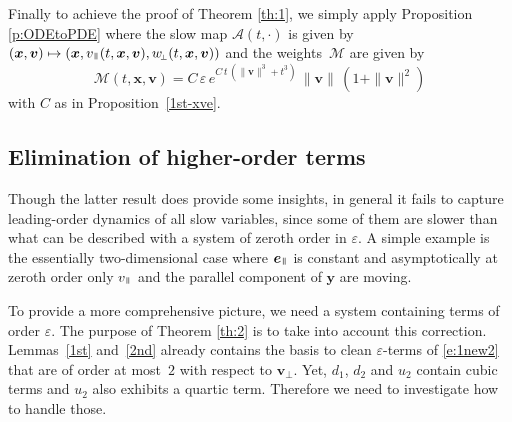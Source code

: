 \documentclass[10pt]{amsart}
\let\mathcal\mathscr
\newcommand\mto{\mathchoice{\longmapsto}{\mapsto}{\mapsto}{\mapsto}}
\newcommand{\sperp}{{\scriptscriptstyle\perp}}
\let\eps\varepsilon
\theoremstyle{plain}
\theoremstyle{definition}
\newcommand\bfv{{\boldsymbol v}}
\newcommand\bfx{{\boldsymbol x}}
\newcommand\bfy{{\boldsymbol y}}
\newcommand\cA{{\mathcal A}}
\newcommand\cM{{\mathcal M}}
\DeclareMathOperator{\beD}{\boldsymbol{e}}
\newcommand\eDpar{\beD_\mypar}
\newcommand\vpar{v_\mypar}
\newcommand\bvperp{\bfv_{\!\sperp}}
\newcommand\eperp{w_{\!\sperp}}
\newcommand{\mypar}{{\mkern3mu\vphantom{\perp}\vrule depth 0pt\mkern2mu\vrule depth 0pt\mkern3mu}}
\begin{document}
Finally to achieve the proof of Theorem \ref{th:1}, we simply apply
Proposition \ref{p:ODEtoPDE} where the slow map $\cA(t,\cdot)$ is
given by $(\bfx,\bfv)\mto (\bfx, \vpar(t,\bfx,\bfv),\eperp(t,\bfx,\bfv))$ and the weights~$\cM$ are given by
\[
\cM(t,\bfx,\bfv)= C\,\eps\,e^{C\,t\,(\|\bfv\|^3+t^3)}
\,\|\bfv\|\,(1+\|\bfv\|^2)
\]
with $C$ as in Proposition~\ref{1st-xve}.

\subsection{Elimination of higher-order terms}
Though the latter result does provide some insights, in general it
fails to capture leading-order dynamics of all slow variables, since
some of them are slower than what can be described with a system of
zeroth order in $\eps$. A simple example is the essentially
two-dimensional case where $\eDpar$ is constant and asymptotically at
zeroth order only $\vpar$ and the parallel component of $\bfy$ are
moving.

To provide a more comprehensive picture, we need a system containing
terms of order $\eps$. The purpose of Theorem
\ref{th:2} is to take into account this correction. Lemmas~\ref{1st} and~\ref{2nd} already contains the basis to clean $\eps$-terms of \eqref{e:1new2} that are of order at most~$2$ with respect to $\bvperp$. Yet, $d_1$, $d_2$ and $u_2$ contain cubic terms and $u_2$ also exhibits a quartic term. Therefore we need to investigate how to handle those.
\end{document}
